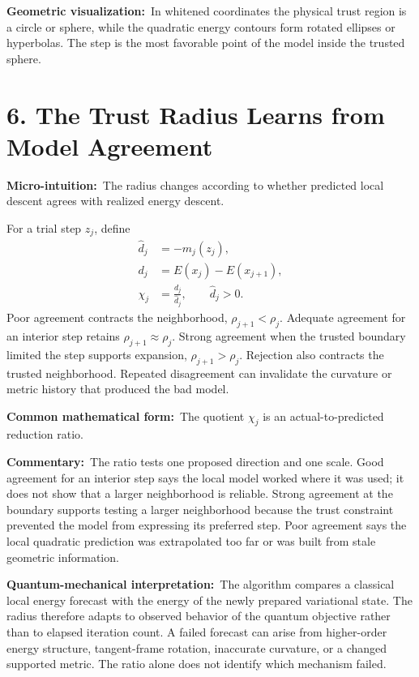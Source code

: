 \documentclass[10pt,twocolumn]{article}
\newcommand{\micro}[1]{\par\noindent\textbf{Micro-intuition:}\ #1\par}
\newcommand{\form}[1]{\par\noindent\textbf{Common mathematical form:}\ #1\par}
\newcommand{\commentary}[1]{\par\noindent\textbf{Commentary:}\ #1\par}
\newcommand{\phys}[1]{\par\noindent\textbf{Quantum-mechanical interpretation:}\ #1\par}
\newcommand{\geom}[1]{\par\noindent\textbf{Geometric visualization:}\ \textcolor{teal!70!black}{#1}\par}
\newcommand{\conceptbreak}{\par\medskip\noindent{\color{black!30}\rule{\columnwidth}{0.35pt}}\par\medskip}
\begin{document}
\geom{In whitened coordinates the physical trust region is a circle or sphere,
while the quadratic energy contours form rotated ellipses or hyperbolas. The
step is the most favorable point of the model inside the trusted sphere.}

\conceptbreak

\section*{6. The Trust Radius Learns from Model Agreement}

\micro{The radius changes according to whether predicted local descent agrees
with realized energy descent.}

For a trial step \(z_j\), define
\begin{align}
\widehat d_j
&=-m_j(z_j),
\label{eq:predicted-descent}\\
d_j
&=E(x_j)-E(x_{j+1}),
\label{eq:realized-descent}\\
\chi_j
&=\frac{d_j}{\widehat d_j},
\qquad \widehat d_j>0.
\label{eq:model-agreement}
\end{align}
Poor agreement contracts the neighborhood,
\(\rho_{j+1}<\rho_j\). Adequate agreement for an interior step retains
\(\rho_{j+1}\approx\rho_j\). Strong agreement when the trusted boundary
limited the step supports expansion, \(\rho_{j+1}>\rho_j\).
Rejection also contracts the trusted neighborhood. Repeated disagreement can
invalidate the curvature or metric history that produced the bad model.

\form{The quotient \(\chi_j\) is an actual-to-predicted reduction ratio.}

\commentary{The ratio tests one proposed direction and one scale. Good agreement
for an interior step says the local model worked where it was used; it does not
show that a larger neighborhood is reliable. Strong agreement at the boundary
supports testing a larger neighborhood because the trust constraint prevented
the model from expressing its preferred step. Poor agreement says the local
quadratic prediction was extrapolated too far or was built from stale geometric
information.}

\phys{The algorithm compares a classical local energy forecast with the energy
of the newly prepared variational state. The radius therefore adapts to observed
behavior of the quantum objective rather than to elapsed iteration count. A
failed forecast can arise from higher-order energy structure, tangent-frame
rotation, inaccurate curvature, or a changed supported metric. The ratio alone
does not identify which mechanism failed.}
\end{document}
